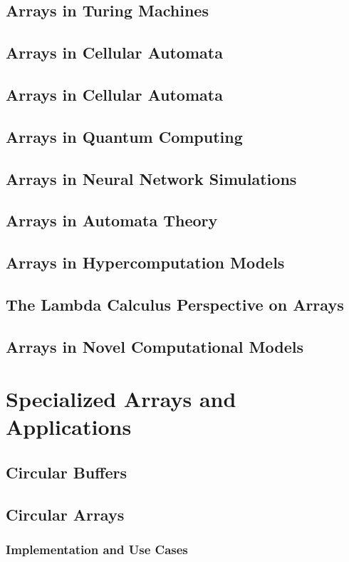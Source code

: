 \documentclass[12pt, oneside]{book}
\begin{document}
\section{Arrays in Turing Machines}
\section{Arrays in Cellular Automata}
\section{Arrays in Cellular Automata}
\section{Arrays in Quantum Computing}
\section{Arrays in Neural Network Simulations}
\section{Arrays in Automata Theory}
\section{Arrays in Hypercomputation Models}
\section{The Lambda Calculus Perspective on Arrays}
\section{Arrays in Novel Computational Models}

\chapter{Specialized Arrays and Applications}
	\section{Circular Buffers}
	\section{Circular Arrays}
	\subsection{Implementation and Use Cases}
\end{document}
